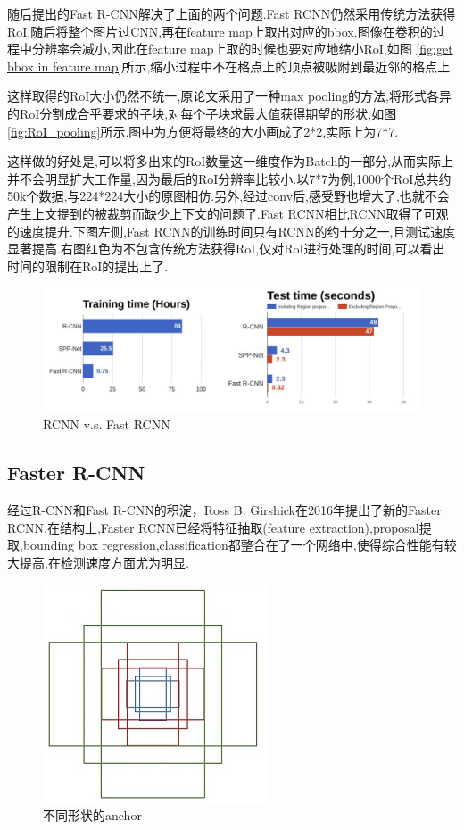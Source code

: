 	随后提出的Fast R-CNN解决了上面的两个问题.Fast RCNN仍然采用传统方法获得RoI,随后将整个图片过CNN,再在feature map上取出对应的bbox.图像在卷积的过程中分辨率会减小,因此在feature map上取的时候也要对应地缩小RoI,如图 \ref{fig:get bbox in feature map}所示,缩小过程中不在格点上的顶点被吸附到最近邻的格点上.
	
	这样取得的RoI大小仍然不统一,原论文采用了一种max pooling的方法,将形式各异的RoI分割成合乎要求的子块,对每个子块求最大值获得期望的形状,如图 \ref{fig:RoI_pooling}所示.图中为方便将最终的大小画成了2*2,实际上为7*7.
	
	这样做的好处是,可以将多出来的RoI数量这一维度作为Batch的一部分,从而实际上并不会明显扩大工作量,因为最后的RoI分辨率比较小.以7*7为例,1000个RoI总共约50k个数据,与224*224大小的原图相仿.另外,经过conv后,感受野也增大了,也就不会产生上文提到的被裁剪而缺少上下文的问题了.Fast RCNN相比RCNN取得了可观的速度提升.下图左侧,Fast RCNN的训练时间只有RCNN的约十分之一,且测试速度显著提高.右图红色为不包含传统方法获得RoI,仅对RoI进行处理的时间,可以看出时间的限制在RoI的提出上了.
	
	\begin{figure}[htbp]
		\centering
		\includegraphics[scale=0.65]{figures/rcnn_vs_frcnn.png}
		\caption{RCNN v.s. Fast RCNN}
		\label{}
	\end{figure}
	
	\subsection{Faster R-CNN}
	
	经过R-CNN和Fast R-CNN的积淀，Ross B. Girshick在2016年提出了新的Faster RCNN.在结构上,Faster RCNN已经将特征抽取(feature extraction),proposal提取,bounding box regression,classification都整合在了一个网络中,使得综合性能有较大提高,在检测速度方面尤为明显.
	
	\begin{figure}
		\includegraphics[scale=0.5]{figures/anchor.jpg}
		\caption{不同形状的anchor}
		\label{fig:anchor}
	\end{figure}
	
